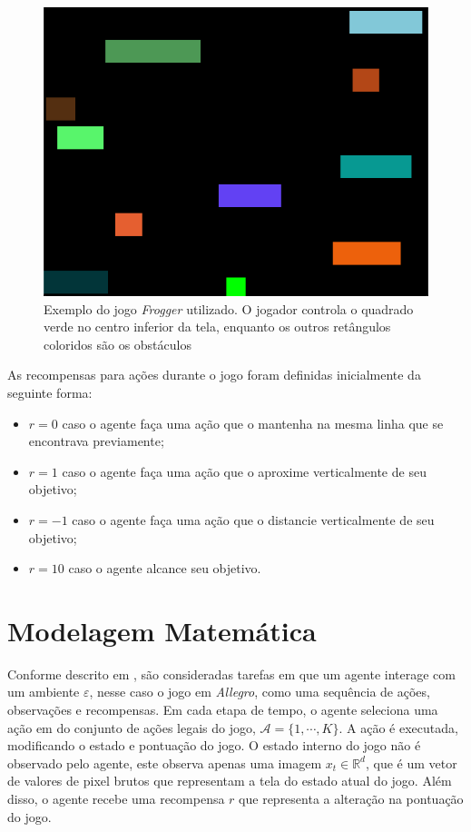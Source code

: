 \begin{figure}[h]
  \centering
  \includegraphics[width=.6 \textwidth]{conteudo/imgs/frogg_ini_state.png}
  \caption[Jogo \textit{Frogger}]{Exemplo do jogo \textit{Frogger} utilizado. O jogador controla o quadrado verde no centro inferior da tela, enquanto os outros retângulos coloridos são os obstáculos}
  \label{fig:frogg}
 \end{figure}

 As recompensas para ações durante o jogo foram definidas inicialmente da seguinte forma:

 \begin{itemize}
 	\item $r=0$ caso o agente faça uma ação que o mantenha na mesma linha que se encontrava previamente;
 	\item $r=1$ caso o agente faça uma ação que o aproxime verticalmente de seu objetivo;
 	\item $r=-1$ caso o agente faça uma ação que o distancie verticalmente de seu objetivo;
 	\item $r=10$ caso o agente alcance seu objetivo.
 \end{itemize}

 


\section{Modelagem Matemática} %
\label{sec:modelagem_matematica}

Conforme descrito em \cite{play-atari-drl-deepmind}, são consideradas tarefas em que um agente interage com um ambiente $\varepsilon$, nesse caso o jogo em \textit{Allegro}, como uma sequência de ações, observações e recompensas. Em cada etapa de tempo, o agente seleciona uma ação em do conjunto de ações legais do jogo, $\mathcal{A} = \{1,\cdots ,K\}$. A ação é executada, modificando o estado e pontuação do jogo.
O estado interno do jogo não é observado pelo agente, este observa apenas uma imagem $x_t \in \mathbb{R}^d$, que é um vetor de valores de pixel brutos que representam a tela do estado atual do jogo. Além disso, o agente recebe uma recompensa $r$ que representa a alteração na pontuação do jogo. 


